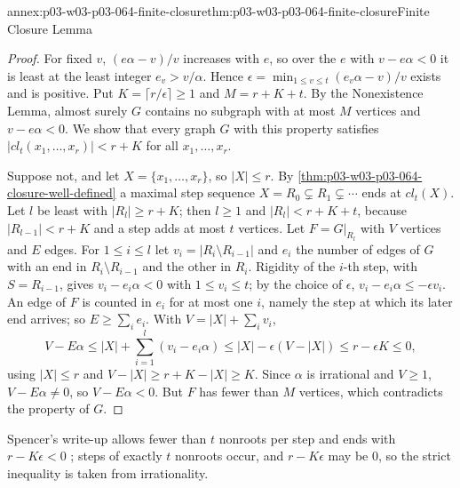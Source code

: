 \begin{annexitem}{annex:p03-w03-p03-064-finite-closure}{thm:p03-w03-p03-064-finite-closure}{Finite Closure Lemma}
\begin{proof}
For fixed \(v\), \((e\alpha-v)/v\) increases with \(e\), so over the \(e\)
with \(v-e\alpha<0\) it is least at the least integer \(e_v>v/\alpha\).
Hence \(\epsilon=\min_{1\leq v\leq t}(e_v\alpha-v)/v\) exists and is positive.
Put \(K=\lceil r/\epsilon\rceil\geq1\) and \(M=r+K+t\).  By the Nonexistence
Lemma, almost surely \(G\) contains no subgraph with at most \(M\) vertices and
\(v-e\alpha<0\).  We show that every graph \(G\) with this property satisfies
\(|cl_t(x_1,\ldots,x_r)|<r+K\) for all \(x_1,\ldots,x_r\).

Suppose not, and let \(X=\{x_1,\ldots,x_r\}\), so \(|X|\leq r\).  By
\cref{thm:p03-w03-p03-064-closure-well-defined} a maximal step sequence
\(X=R_0\subsetneq R_1\subsetneq\cdots\) ends at \(cl_t(X)\).  Let \(l\) be
least with \(|R_l|\geq r+K\); then \(l\geq1\) and
\(|R_l|<r+K+t\), because \(|R_{l-1}|<r+K\) and a step adds at most \(t\)
vertices.  Let \(F=G|_{R_l}\) with \(V\) vertices and \(E\) edges.  For
\(1\leq i\leq l\) let \(v_i=|R_i\setminus R_{i-1}|\) and \(e_i\) the number
of edges of \(G\) with an end in \(R_i\setminus R_{i-1}\) and the other in
\(R_i\).  Rigidity of the \(i\)-th step, with \(S=R_{i-1}\), gives
\(v_i-e_i\alpha<0\) with \(1\leq v_i\leq t\); by the choice of \(\epsilon\),
\(v_i-e_i\alpha\leq-\epsilon v_i\).  An edge of \(F\) is counted in \(e_i\)
for at most one \(i\), namely the step at which its later end arrives; so
\(E\geq\sum_ie_i\).  With \(V=|X|+\sum_iv_i\),
\[
  V-E\alpha\leq|X|+\sum_{i=1}^l(v_i-e_i\alpha)\leq|X|-\epsilon(V-|X|)
  \leq r-\epsilon K\leq0,
\]
using \(|X|\leq r\) and \(V-|X|\geq r+K-|X|\geq K\).  Since \(\alpha\) is
irrational and \(V\geq1\), \(V-E\alpha\neq0\), so \(V-E\alpha<0\).  But
\(F\) has fewer than \(M\) vertices, which contradicts the property of \(G\).
\end{proof}
Spencer's write-up allows fewer than \(t\) nonroots per step and ends with
\(r-K\epsilon<0\) \cite[p.~9]{Spencer2007LogicRandomStructuresAuthor}; steps
of exactly \(t\) nonroots occur, and \(r-K\epsilon\) may be \(0\), so the
strict inequality is taken from irrationality.
\end{annexitem}

